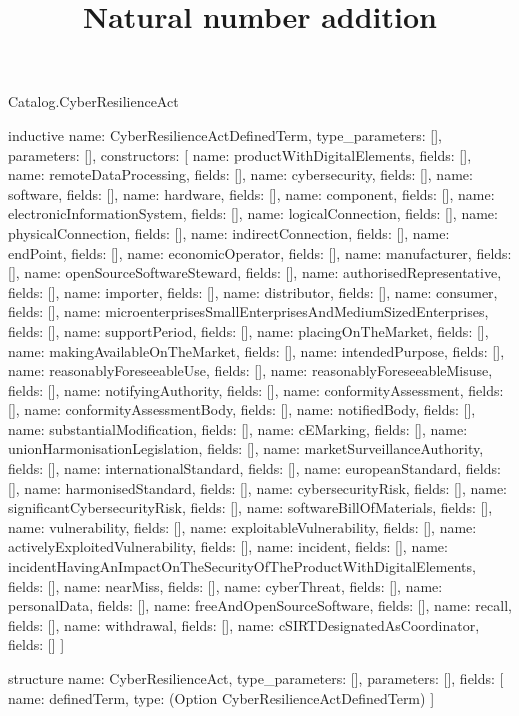 \begin{lexlean}{Catalog.CyberResilienceAct}
\title{Natural number addition}
\begin{semanticmodule}
inductive{
  name: CyberResilienceActDefinedTerm,
  type_parameters: [],
  parameters: [],
  constructors: [
    {name: productWithDigitalElements, fields: []},
    {name: remoteDataProcessing, fields: []},
    {name: cybersecurity, fields: []},
    {name: software, fields: []},
    {name: hardware, fields: []},
    {name: component, fields: []},
    {name: electronicInformationSystem, fields: []},
    {name: logicalConnection, fields: []},
    {name: physicalConnection, fields: []},
    {name: indirectConnection, fields: []},
    {name: endPoint, fields: []},
    {name: economicOperator, fields: []},
    {name: manufacturer, fields: []},
    {name: openSourceSoftwareSteward, fields: []},
    {name: authorisedRepresentative, fields: []},
    {name: importer, fields: []},
    {name: distributor, fields: []},
    {name: consumer, fields: []},
    {name: microenterprisesSmallEnterprisesAndMediumSizedEnterprises, fields: []},
    {name: supportPeriod, fields: []},
    {name: placingOnTheMarket, fields: []},
    {name: makingAvailableOnTheMarket, fields: []},
    {name: intendedPurpose, fields: []},
    {name: reasonablyForeseeableUse, fields: []},
    {name: reasonablyForeseeableMisuse, fields: []},
    {name: notifyingAuthority, fields: []},
    {name: conformityAssessment, fields: []},
    {name: conformityAssessmentBody, fields: []},
    {name: notifiedBody, fields: []},
    {name: substantialModification, fields: []},
    {name: cEMarking, fields: []},
    {name: unionHarmonisationLegislation, fields: []},
    {name: marketSurveillanceAuthority, fields: []},
    {name: internationalStandard, fields: []},
    {name: europeanStandard, fields: []},
    {name: harmonisedStandard, fields: []},
    {name: cybersecurityRisk, fields: []},
    {name: significantCybersecurityRisk, fields: []},
    {name: softwareBillOfMaterials, fields: []},
    {name: vulnerability, fields: []},
    {name: exploitableVulnerability, fields: []},
    {name: activelyExploitedVulnerability, fields: []},
    {name: incident, fields: []},
    {name: incidentHavingAnImpactOnTheSecurityOfTheProductWithDigitalElements, fields: []},
    {name: nearMiss, fields: []},
    {name: cyberThreat, fields: []},
    {name: personalData, fields: []},
    {name: freeAndOpenSourceSoftware, fields: []},
    {name: recall, fields: []},
    {name: withdrawal, fields: []},
    {name: cSIRTDesignatedAsCoordinator, fields: []}
  ]
}

structure{
  name: CyberResilienceAct,
  type_parameters: [],
  parameters: [],
  fields: [
    {name: definedTerm, type: (Option CyberResilienceActDefinedTerm)}
  ]
}
\end{semanticmodule}
\end{lexlean}

